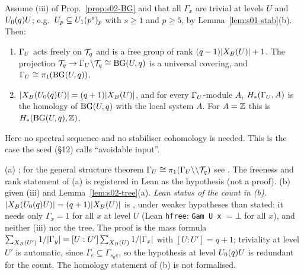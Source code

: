 \begin{proposition}\label{prop:s02-free}
Assume (iii) of Prop.~\ref{prop:s02-BG} and that all $\Gamma_x$ are trivial at levels $U$ and $U_0(q)U$;
e.g.\ $U_p\subseteq U_1(p^s)_p$ with $s\ge1$ and $p\ge5$, by Lemma~\ref{lem:s01-stab}(b). Then:
\begin{enumerate}[label=(\alph*)]
\item $\Gamma_U$ acts freely on $\mathcal{T}_q$ and is a free group of rank $(q-1)|X_B(U)|+1$. The projection $\mathcal{T}_q\to\Gamma_U\backslash\mathcal{T}_q\cong\mathrm{BG}(U,q)$ is a universal
  covering, and $\Gamma_U\cong\pi_1(\mathrm{BG}(U,q))$.
\item $|X_B(U_0(q)U)|=(q+1)|X_B(U)|$, and for every $\Gamma_U$-module $A$, $H_*(\Gamma_U,A)$ is the homology of $\mathrm{BG}(U,q)$
  with the local system $A$. For $A=\mathbb{Z}$ this is $H_*(\mathrm{BG}(U,q),\mathbb{Z})$.
\end{enumerate}
Here no spectral sequence and no stabiliser cohomology is needed. This is the case the seed (\S12) calls
``avoidable input''.
\end{proposition}
\noindent (a) \stpmc{} ; for the
general structure theorem $\Gamma_U\cong\pi_1(\Gamma_U\backslash\backslash\mathcal{T}_q)$ see .
The freeness and rank statement of (a) is registered in Lean as the hypothesis  (not a proof).
(b) \stproved{} given (iii) and Lemma~\ref{lem:s02-tree}(a).
\emph{Lean status of the count in (b).} $|X_B(U_0(q)U)|=(q+1)|X_B(U)|$ is \stformal{}
, under weaker hypotheses than stated: it needs only $\Gamma_x=1$ for all $x$ at level
$U$ (Lean \texttt{hfree}: \texttt{Gam U x} $=\bot$ for all $x$), and neither (iii) nor the tree. The proof is the mass formula
$\sum_{X_B(U')}1/|\Gamma_y|=[U:U']\sum_{X_B(U)}1/|\Gamma_x|$ with $[U:U']=q+1$; triviality at level $U'$ is automatic, since
$\Gamma_e\subseteq\Gamma_{s_0e}$, so the hypothesis at level $U_0(q)U$ is redundant for the count. The homology statement of (b) is
not formalised.
